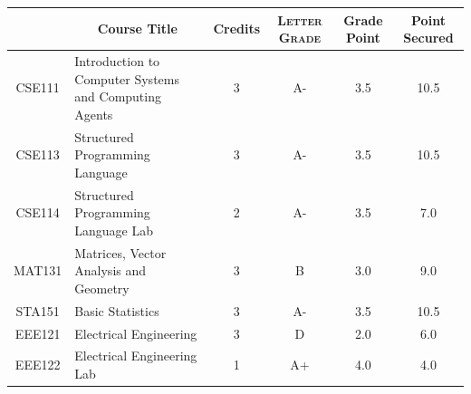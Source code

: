 \documentclass[11pt]{article}
\newcommand*{\numtwo}[1]{\pgfmathprintnumber[
                    fixed, precision=2, fixed zerofill=true]{#1}}
\begin{document}
                \begin{center}
                    \renewcommand{\arraystretch}{1.08}
                    
                \begin{tabular}{|c|l|c|>{\scshape}c|c|c|}
                \hline  \rule[-1ex]{0pt}{3.5ex} {\centering{\bf Course Code}} &  \multicolumn{1}{c|}{\textbf{Course Title}}  & {\bf Credits} & {\bf Letter Grade} & {\bf Grade Point} & {\bf Point Secured}  \\ 
                \hline   CSE111 &  Introduction to Computer Systems and Computing Agents		 & 3 & A- & 3.5 & 10.5 \\ %
                \hline   CSE113 &  Structured Programming Language		 & 3 & A- & 3.5 & 10.5 \\ %
                \hline   CSE114 &  Structured Programming Language Lab		 & 2 & A- & 3.5 & 7.0 \\ %
                \hline   MAT131 &  Matrices, Vector Analysis and Geometry		 & 3 & B & 3.0 & 9.0 \\ %
                \hline   STA151 &  Basic Statistics		 & 3 & A- & 3.5 & 10.5 \\ %
                \hline   EEE121 &  Electrical Engineering		 & 3 & D & 2.0 & 6.0 \\ %
                \hline   EEE122 &  Electrical Engineering Lab		 & 1 & A+ & 4.0 & 4.0 \\ %

\hline                %
                \end{tabular}
                \end{center}
                \renewcommand{\arraystretch}{1.03}
\end{document}
